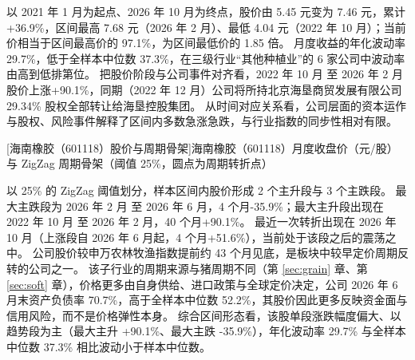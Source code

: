  以 2021 年 1 月为起点、2026 年 10 月为终点，股价由 5.45 元变为 7.46 元，累计 +36.9\%，区间最高 7.68 元（2026 年 2 月）、最低 4.04 元（2022 年 10 月）；当前价相当于区间最高价的 97.1\%，为区间最低价的 1.85 倍。 月度收益的年化波动率 29.7\%，低于全样本中位数 37.3\%，在三级行业“其他种植业”的 6 家公司中波动率由高到低排第位。 把股价阶段与公司事件对齐看，2022 年 10 月 至 2026 年 2 月股价上涨+90.1\%，同期（2022 年 12 月）公司将所持北京海垦商贸发展有限公司 29.34\% 股权全部转让给海垦控股集团。 从时间对应关系看，公司层面的资本运作与股权、风险事件解释了区间内多数急涨急跌，与行业指数的同步性相对有限。

\begin{center}
\begin{minipage}{\textwidth}\centering
{}

[海南橡胶（601118）股价与周期骨架]{海南橡胶（601118）月度收盘价（元/股）与 ZigZag 周期骨架（阈值 25\%，圆点为周期转折点）}
\end{minipage}
\end{center}

 以 25\% 的 ZigZag 阈值划分，样本区间内股价形成 2 个主升段与 3 个主跌段。 最大主跌段为 2026 年 2 月 至 2026 年 6 月，4 个月-35.9\%；最大主升段出现在 2022 年 10 月 至 2026 年 2 月，40 个月+90.1\%。 最近一次转折出现在 2026 年 10 月（上涨段自 2026 年 6 月起，4 个月+51.6\%），当前处于该段之后的震荡之中。 公司股价较申万农林牧渔指数提前约 43 个月见底，是板块中较早定价周期反转的公司之一。 该子行业的周期来源与猪周期不同（第 \ref{sec:grain} 章、第 \ref{sec:soft} 章），价格更多由自身供给、进口政策与全球定价决定，公司 2026 年 6 月末资产负债率 70.7\%，高于全样本中位数 52.2\%，其股价因此更多反映资金面与信用风险，而不是价格弹性本身。 综合区间形态看，该股单段涨跌幅度偏大、以趋势段为主（最大主升 +90.1\%、最大主跌 -35.9\%），年化波动率 29.7\% 与全样本中位数 37.3\% 相比波动小于样本中位数。

